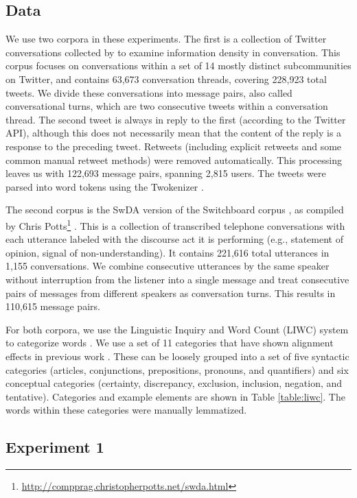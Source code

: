 \documentclass[11pt]{article}
\begin{document}
\subsection{Data}
We use two corpora in these experiments. The first is a collection of Twitter conversations collected by \cite{DoyleFrank2015CMCL} to examine information density in conversation. This corpus focuses on conversations within a set of 14 mostly distinct subcommunities on Twitter, and contains 63,673 conversation threads, covering 228,923 total tweets.  We divide these conversations into message pairs, also called conversational turns, which are two consecutive tweets within a conversation thread.  The second tweet is always in reply to the first (according to the Twitter API), although this does not necessarily mean that the content of the reply is a response to the preceding tweet. Retweets (including explicit retweets and some common manual retweet methods) were removed automatically. This processing leaves us with 122,693 message pairs, spanning 2,815 users.  The tweets were parsed into word tokens using the Twokenizer \cite{OwoputiEtAl2013}.

The second corpus is the SwDA version of the Switchboard corpus \cite{JurafskyShribergBiasca1997}, as compiled by Chris Potts\footnote{\url{http://compprag.christopherpotts.net/swda.html}} . This is a collection of transcribed telephone conversations with each utterance labeled with the discourse act it is performing (e.g., statement of opinion, signal of non-understanding).  It contains 221,616 total utterances in 1,155 conversations.  We combine consecutive utterances by the same speaker without interruption from the listener into a single message and treat consecutive pairs of messages from different speakers as conversation turns. This results in 110,615 message pairs.

For both corpora, we use the Linguistic Inquiry and Word Count (LIWC) system to categorize words \cite{LIWC}.  We use a set of 11 categories that have shown alignment effects in previous work \cite{DNMGamonDumais2011}. These can be loosely grouped into a set of five syntactic categories (articles, conjunctions, prepositions, pronouns, and quantifiers) and six conceptual categories (certainty, discrepancy, exclusion, inclusion, negation, and tentative). Categories and example elements are shown in Table \ref{table:liwc}.  The words within these categories were manually lemmatized.

\subsection{Experiment 1}
\end{document}
